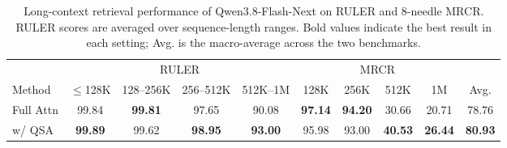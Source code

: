 \begin{table}[t]
\centering
\small
\caption{Model performance comparison between Qwen3.8-Flash-Next with full attention and QSA across widely used knowledge, STEM, reasoning, multilingual, and coding benchmarks. Bold values indicate the best result for each benchmark.}
\label{tab:qsa-pt-eval}
\end{table}

\begin{table}[t]
\centering
\small
\caption{Long-context retrieval performance of Qwen3.8-Flash-Next on RULER and 8-needle MRCR.
RULER scores are averaged over sequence-length ranges. 
Bold values indicate the best result in each setting;
Avg. is the macro-average across the two benchmarks.}
\label{tab:qsa-long-context-eval}
\setlength{\tabcolsep}{4pt}
\begin{tabular}{l cccc cccc c}
\toprule
& \multicolumn{4}{c}{RULER}
& \multicolumn{4}{c}{MRCR}
& \\
\cmidrule(lr){2-5}
\cmidrule(lr){6-9}
Method
& $\leq$128K
& 128--256K
& 256--512K
& 512K--1M
& 128K
& 256K
& 512K
& 1M
& Avg.\\
\midrule
Full Attn
& 99.84 & \textbf{99.81} & 97.65 & 90.08
& \textbf{97.14} & \textbf{94.20} & 30.66 & 20.71 & 78.76 \\
w/ QSA
& \textbf{99.89} & 99.62 & \textbf{98.95} & \textbf{93.00}
& 95.98 & 93.00 & \textbf{40.53} & \textbf{26.44}
& \textbf{80.93} \\
\bottomrule
\end{tabular}
\end{table}

